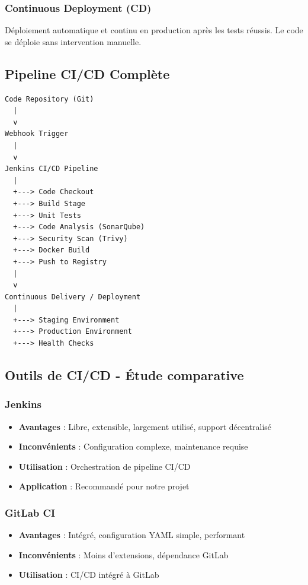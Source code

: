 \documentclass[12pt,a4paper]{report}
\begin{document}
\subsubsection{Continuous Deployment (CD)}

Déploiement automatique et continu en production après les tests réussis. Le code se déploie sans intervention manuelle.

\subsection{Pipeline CI/CD Complète}

\begin{verbatim}
Code Repository (Git)
  |
  v
Webhook Trigger
  |
  v
Jenkins CI/CD Pipeline
  |
  +---> Code Checkout
  +---> Build Stage
  +---> Unit Tests
  +---> Code Analysis (SonarQube)
  +---> Security Scan (Trivy)
  +---> Docker Build
  +---> Push to Registry
  |
  v
Continuous Delivery / Deployment
  |
  +---> Staging Environment
  +---> Production Environment
  +---> Health Checks
\end{verbatim}

\subsection{Outils de CI/CD - Étude comparative}

\subsubsection{Jenkins}

\begin{itemize}
    \item \textbf{Avantages} : Libre, extensible, largement utilisé, support décentralisé
    \item \textbf{Inconvénients} : Configuration complexe, maintenance requise
    \item \textbf{Utilisation} : Orchestration de pipeline CI/CD
    \item \textbf{Application} : Recommandé pour notre projet
\end{itemize}

\subsubsection{GitLab CI}

\begin{itemize}
    \item \textbf{Avantages} : Intégré, configuration YAML simple, performant
    \item \textbf{Inconvénients} : Moins d'extensions, dépendance GitLab
    \item \textbf{Utilisation} : CI/CD intégré à GitLab
\end{itemize}
\end{document}
